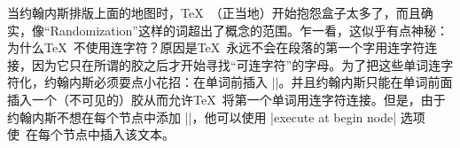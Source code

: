 
当约翰内斯排版上面的地图时，\TeX\ （正当地）开始抱怨盒子太多了，而且确实，像``Randomization''这样的词超出了概念的范围。乍一看，这似乎有点神秘：为什么\TeX\ 不使用连字符？原因是\TeX\ 永远不会在段落的第一个字用连字符连接，因为它只在所谓的胶之后才开始寻找``可连字符''的字母。为了把这些单词连字符化，约翰内斯必须耍点小花招：在单词前插入 |\hskip0pt|。并且约翰内斯只能在单词前面插入一个（不可见的）胶从而允许\TeX\ 将第一个单词用连字符连接。但是，由于约翰内斯不想在每个节点中添加 |\hskip0pt|，他可以使用 |execute at begin node| 选项使\tikzname\ 在每个节点中插入该文本。

